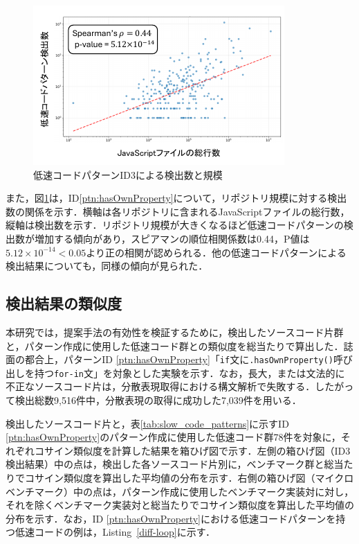 \documentclass[submit,techrep,noauthor]{ipsj}
\begin{document}
\begin{figure}[t]
    \centering
    \includegraphics[width=1.0\linewidth]{./Noguchi_fig/log_ID3_spia.pdf}
    \caption{低速コードパターンID3による検出数と規模}
    \label{fig:plot_id3}
\end{figure}

また，図\ref{fig:plot_id3}は，ID\ref{ptn:hasOwnProperty}について，リポジトリ規模に対する検出数の関係を示す．横軸は各リポジトリに含まれるJavaScriptファイルの総行数，縦軸は検出数を示す．リポジトリ規模が大きくなるほど低速コードパターンの検出数が増加する傾向があり，スピアマンの順位相関係数は0.44，P値は\(5.12 \times 10^{-14} < 0.05\)より正の相関が認められる．他の低速コードパターンによる検出結果についても，同様の傾向が見られた．

\subsection{検出結果の類似度}

本研究では，提案手法の有効性を検証するために，検出したソースコード片群と，パターン作成に使用した低速コード群との類似度を総当たりで算出した．誌面の都合上，パターンID \ref{ptn:hasOwnProperty}「\texttt{if}文に\texttt{.hasOwnProperty()}呼び出しを持つ\texttt{for-in}文」を対象とした実験を示す．なお，長大，または文法的に不正なソースコード片は，分散表現取得における構文解析で失敗する．したがって検出総数9,516件中，分散表現の取得に成功した7,039件を用いる．


検出したソースコード片と，表\ref{tab:slow_code_patterns}に示すID \ref{ptn:hasOwnProperty}のパターン作成に使用した低速コード群78件を対象に，それぞれコサイン類似度を計算した結果を箱ひげ図で示す．左側の箱ひげ図（ID3検出結果）中の点は，検出した各ソースコード片別に，ベンチマーク群と総当たりでコサイン類似度を算出した平均値の分布を示す．右側の箱ひげ図（マイクロベンチマーク）中の点は，パターン作成に使用したベンチマーク実装対に対し，それを除くベンチマーク実装対と総当たりでコサイン類似度を算出した平均値の分布を示す．なお，ID \ref{ptn:hasOwnProperty}における低速コードパターンを持つ低速コードの例は，Listing~\ref{diff-loop}に示す．
\end{document}
